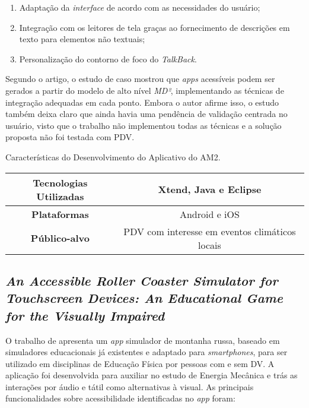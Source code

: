 \begin{enumerate}
  \item Adaptação da \emph{interface} de acordo com as necessidades do usuário;
  \item Integração com os leitores de tela graças ao fornecimento de descrições em texto para elementos não textuais;
  \item Personalização do contorno de foco do \emph{TalkBack}.
\end{enumerate}

Segundo o artigo, o estudo de caso mostrou que \emph{apps} acessíveis podem ser gerados a partir do modelo de alto nível \emph{MD²}, implementando as técnicas de integração adequadas em
cada ponto. Embora o autor afirme isso, o estudo também deixa claro que ainda havia uma pendência de validação centrada no usuário, visto que o trabalho não implementou todas as técnicas
e a solução proposta não foi testada com PDV\@.

\begin{quadro}[htb!]
  \caption{\label{qua-car-am2}Características do Desenvolvimento do Aplicativo do AM2.}
  \begin{tabular}{|c|c|}
    \hline
    \textbf{Tecnologias Utilizadas} & Xtend, Java e Eclipse                          \\ \hline
    \textbf{Plataformas}            & Android e iOS                                  \\ \hline
    \textbf{Público-alvo}           & PDV com interesse em eventos climáticos locais \\
    \hline
  \end{tabular}
\end{quadro}

\subsection{\emph{An Accessible Roller Coaster Simulator for Touchscreen Devices: An Educational Game for the Visually Impaired}}

O trabalho de  apresenta um \emph{app} simulador de montanha russa, baseado em simuladores educacionais já existentes
e adaptado para \emph{smartphones}, para ser utilizado em disciplinas de Educação Física por pessoas com e sem DV\@.
A aplicação foi desenvolvida para auxiliar no estudo de Energia Mecânica e trás as interações por áudio e tátil como alternativas à visual.
As principais funcionalidades sobre acessibilidade identificadas no \emph{app} foram:

